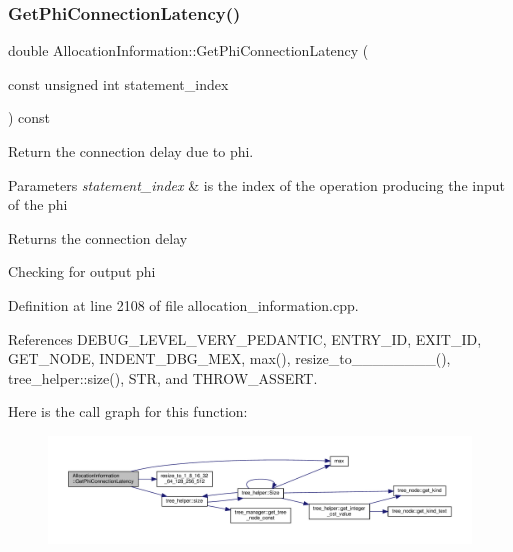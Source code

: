\subsubsection{\texorpdfstring{Get\+Phi\+Connection\+Latency()}{GetPhiConnectionLatency()}}
{\footnotesize\ttfamily double Allocation\+Information\+::\+Get\+Phi\+Connection\+Latency (\begin{DoxyParamCaption}\item[{const unsigned int}]{statement\+\_\+index }\end{DoxyParamCaption}) const\hspace{0.3cm}{\ttfamily [private]}}



Return the connection delay due to phi. 


\begin{DoxyParams}{Parameters}
{\em statement\+\_\+index} & is the index of the operation producing the input of the phi \\
\hline
\end{DoxyParams}
\begin{DoxyReturn}{Returns}
the connection delay 
\end{DoxyReturn}
Checking for output phi 

Definition at line 2108 of file allocation\+\_\+information.\+cpp.



References D\+E\+B\+U\+G\+\_\+\+L\+E\+V\+E\+L\+\_\+\+V\+E\+R\+Y\+\_\+\+P\+E\+D\+A\+N\+T\+IC, E\+N\+T\+R\+Y\+\_\+\+ID, E\+X\+I\+T\+\_\+\+ID, G\+E\+T\+\_\+\+N\+O\+DE, I\+N\+D\+E\+N\+T\+\_\+\+D\+B\+G\+\_\+\+M\+EX, max(), resize\+\_\+to\+\_\+\_\+\_\+\_\+\_\+\_\+\_\+\_(), tree\+\_\+helper\+::size(), S\+TR, and T\+H\+R\+O\+W\+\_\+\+A\+S\+S\+E\+RT.

Here is the call graph for this function\+:
\nopagebreak
\begin{figure}[H]
\begin{center}
\leavevmode
\includegraphics[width=350pt]{d7/d79/classAllocationInformation_a2f6e61eeb7824e2da224e7fcc183c523_cgraph}
\end{center}
\end{figure}
\mbox{\label{classAllocationInformation_a6b0a7b42d192682285f640c8499e142d}} 
